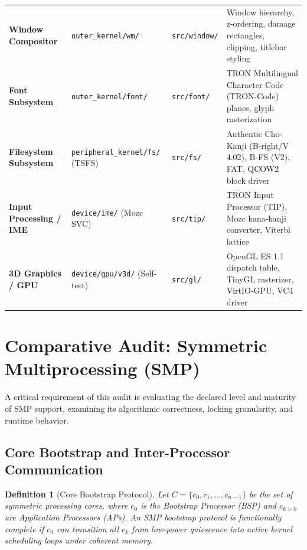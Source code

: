 \documentclass[10pt,journal,compsoc,twocolumn]{article}
\newtheorem{definition}{Definition}
\begin{document}
\begin{table}[t]
\begin{tabularx}{\textwidth}{@{} >{\raggedright\arraybackslash\bfseries}p{3.2cm} >{\raggedright\arraybackslash}p{3.8cm} >{\raggedright\arraybackslash}p{3.8cm} >{\raggedright\arraybackslash}X @{}}
Window Compositor & \texttt{outer\_kernel/wm/} & \texttt{src/window/} & Window hierarchy, z-ordering, damage rectangles, clipping, titlebar styling \\
Font Subsystem & \texttt{outer\_kernel/font/} & \texttt{src/font/} & TRON Multilingual Character Code (TRON-Code) planes, glyph rasterization \\
Filesystem Subsystem & \texttt{peripheral\_kernel/fs/} (TSFS) & \texttt{src/fs/} & Authentic Cho-Kanji (B-right/V 4.02), B-FS (V2), FAT, QCOW2 block driver \\
Input Processing / IME & \texttt{device/ime/} (Mozc SVC) & \texttt{src/tip/} & TRON Input Processor (TIP), Mozc kana-kanji converter, Viterbi lattice \\
3D Graphics / GPU & \texttt{device/gpu/v3d/} (Self-test) & \texttt{src/gl/} & OpenGL ES 1.1 dispatch table, TinyGL rasterizer, VirtIO-GPU, VC4 driver \\
\bottomrule
\end{tabularx}
\end{table}

\section{Comparative Audit: Symmetric Multiprocessing (SMP)}
\label{sec:smp}

A critical requirement of this audit is evaluating the declared level and maturity of SMP support, examining its algorithmic correctness, locking granularity, and runtime behavior.

\subsection{Core Bootstrap and Inter-Processor Communication}

\begin{definition}[Core Bootstrap Protocol]
Let $C = \{c_0, c_1, \dots, c_{n-1}\}$ be the set of symmetric processing cores, where $c_0$ is the Bootstrap Processor (BSP) and $c_{k > 0}$ are Application Processors (APs). An SMP bootstrap protocol is functionally complete if $c_0$ can transition all $c_k$ from low-power quiescence into active kernel scheduling loops under coherent memory.
\end{definition}
\end{document}
